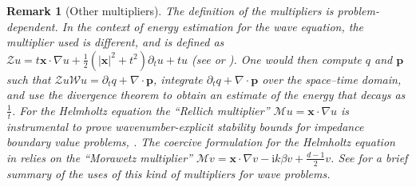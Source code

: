 \documentclass[a4paper]{article}
\theoremstyle{plain}
\newtheorem{remark}[theorem]{Remark}
\theoremstyle{definition}
\newcommand{\operator}[1]{\mathcal{#1}}
\newcommand{\Div}[1]{\nabla \cdot #1}
\newcommand{\Grad}[1]{\nabla #1}
\newcommand{\TimeDer}{{\partial^{}_t}}
\newcommand{\vect}[1]{\bm{#1}}
\begin{document}
\begin{remark}[Other multipliers]\label{remark:energy_estimation}
	The definition of the multipliers is problem-dependent.
	In the context of energy estimation for the wave equation, the multiplier used is  different, and is defined as $\operator{Z}u = t\vect{x} \cdot \Grad u + \frac{1}{2}(|\vect{x}|^2 + t^2)\partial_tu + t u$ (see \cite[App.~3]{lax1990scattering} or \cite{Morris2018}). One would then compute $q$ and $\vect{p}$ such that $\operator{Z}u \operator{W}u = \TimeDer{q} + \Div \vect{p}$,  integrate $\TimeDer{q} + \Div \vect{p}$ over the space--time domain, and use the divergence theorem to obtain an estimate of the energy that decays  as $\frac{1}{t}$.
	For the Helmholtz equation the ``Rellich multiplier'' $\operator Mu=\vect x\cdot\Grad u$ is instrumental to prove wavenumber-explicit stability bounds for impedance boundary value problems, \cite[Prop.~8.1.4]{melenk1995generalized}.
	The coercive formulation for the Helmholtz equation in \cite{Moiola2014} relies on the ``Morawetz multiplier'' $\operator{M}v = \vect{x} \cdot \Grad v - \textrm{i}k\beta v + \frac{d-1}{2}v$.
	See \cite[sect.~1.4]{Moiola2014} for a brief summary of the uses of this kind of multipliers for wave problems.
\end{remark}
\end{document}
